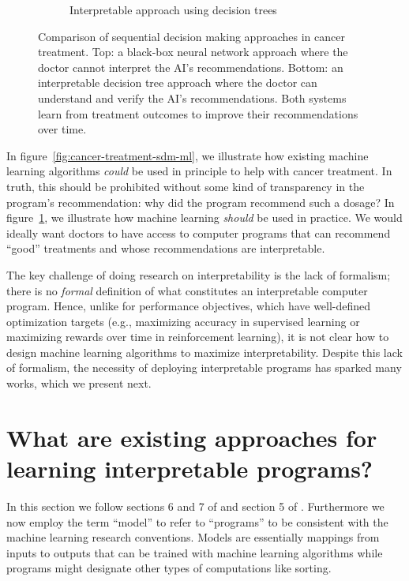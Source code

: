 \begin{figure}
\begin{subfigure}[b]{0.7\textwidth}
\begin{tikzpicture}
        \end{tikzpicture}
        \caption{Interpretable approach using decision trees}
        \label{fig:cancer-treatment-comparison}
    \end{subfigure}
    \caption{Comparison of sequential decision making approaches in cancer treatment. Top: a black-box neural network approach where the doctor cannot interpret the AI's recommendations. Bottom: an interpretable decision tree approach where the doctor can understand and verify the AI's recommendations. Both systems learn from treatment outcomes to improve their recommendations over time.}
    \label{fig:cancer-treatment-comparison-combined}
\end{figure}

In figure~\ref{fig:cancer-treatment-sdm-ml}, we illustrate how existing machine learning algorithms \textit{could} be used in principle to help with cancer treatment. In truth, this should be prohibited without some kind of transparency in the program's recommendation: why did the program recommend such a dosage?
In figure~\ref{fig:cancer-treatment-comparison}, we illustrate how machine learning \textit{should} be used in practice. We would ideally want doctors to have access to computer programs that can recommend ``good'' treatments and whose recommendations are interpretable. 

The key challenge of doing research on interpretability is the lack of formalism; there is no \textit{formal} definition of what constitutes an interpretable computer program. Hence, unlike for performance objectives, which have well-defined optimization targets (e.g., maximizing accuracy in supervised learning or maximizing rewards over time in reinforcement learning), it is not clear how to design machine learning algorithms to maximize interpretability. 
Despite this lack of formalism, the necessity of deploying interpretable programs has sparked many works, which we present next.
\section{What are existing approaches for learning interpretable programs?}

In this section we follow sections 6 and 7 of \cite{glanois-survey} and section 5 of \cite{milani-survey}. 
Furthermore we now employ the term ``model'' to refer to ``programs'' to be consistent with the machine learning research conventions.
Models are essentially mappings from inputs to outputs that can be trained with machine learning algorithms while programs might designate other types of computations like sorting.

